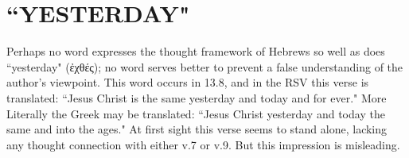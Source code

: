 \section{``YESTERDAY"}
Perhaps no word expresses the thought framework of Hebrews so well as does
``yesterday" (ἐχθές); no word serves better to prevent a false understanding of
the author's viewpoint.
This word occurs in 13.8, and in the RSV this verse is translated: ``Jesus
Christ is the same yesterday and today and for ever."
More Literally the Greek may be translated: ``Jesus Christ yesterday and today
the same and into the ages."
At first sight this verse seems to stand alone, lacking any thought connection
with either v.7 or v.9.
But this impression is misleading.


